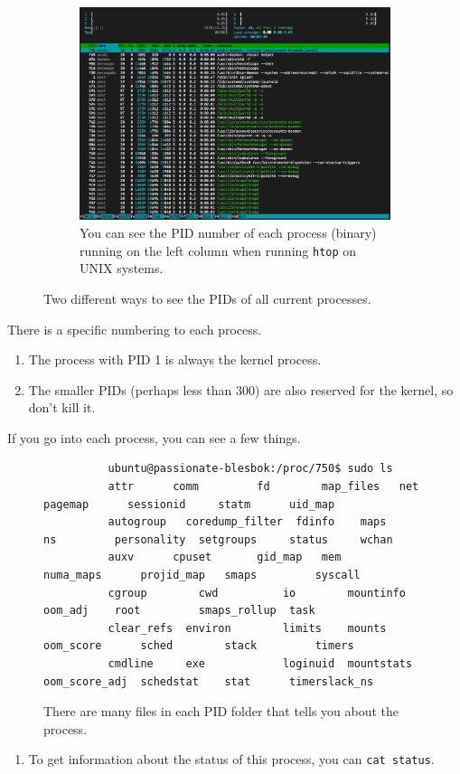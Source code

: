 \documentclass{article}
\begin{document}
\begin{example}
\begin{figure}[H]
        \begin{subfigure}[b]{0.95\textwidth}
        \centering
          \includegraphics[width=\textwidth]{img/htop.png}
          \caption{You can see the PID number of each process (binary) running on the left column when running \texttt{htop} on UNIX systems. }
          \label{fig:htop}
        \end{subfigure}
        \caption{Two different ways to see the PIDs of all current processes. }
        \label{fig:}
      \end{figure}
      There is a specific numbering to each process. 
      \begin{enumerate}
        \item The process with PID 1 is always the kernel process. 
        \item The smaller PIDs (perhaps less than 300) are also reserved for the kernel, so don't kill it. 
      \end{enumerate}

      If you go into each process, you can see a few things.  
      
      \begin{figure}[H]
        \centering 
        \begin{lstlisting}
          ubuntu@passionate-blesbok:/proc/750$ sudo ls
          attr	    comm	     fd        map_files   net		  pagemap      sessionid     statm	    uid_map
          autogroup   coredump_filter  fdinfo    maps	   ns		  personality  setgroups     status	    wchan
          auxv	    cpuset	     gid_map   mem	   numa_maps	  projid_map   smaps	     syscall
          cgroup	    cwd		     io        mountinfo   oom_adj	  root	       smaps_rollup  task
          clear_refs  environ	     limits    mounts	   oom_score	  sched        stack	     timers
          cmdline     exe		     loginuid  mountstats  oom_score_adj  schedstat    stat	     timerslack_ns
        \end{lstlisting}
        \caption{There are many files in each PID folder that tells you about the process. } 
        \label{fig:pid_info}
      \end{figure}
      \begin{enumerate}
        \item To get information about the status of this process, you can \texttt{cat status}. 


\end{enumerate}
\end{example}
\end{document}
